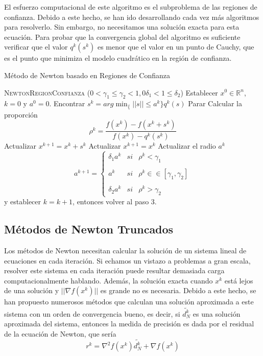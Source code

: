 El esfuerzo computacional de este algoritmo es el subproblema de las regiones de confianza. 
Debido a este hecho, se han ido desarrollando cada vez más algoritmos para resolverlo. 
Sin embargo, no necesitamos una solución exacta para esta ecuación. 
Para probar que la convergencia global del algoritmo es suficiente verificar que el valor $q^k(s^k)$ es menor que el valor en un punto de Cauchy, que es el punto que minimiza el modelo cuadrático en la región de confianza.

\begin{algorithm}[H]
\caption{Método de Newton basado en Regiones de Confianza}\label{alg:TrustRegionNewton}
\begin{algorithmic}[1]
\Procedure \textsc{NewtonRegionConfianza} ($0<\gamma_1\leq\gamma_2<1, 0 \delta_1 < 1 \leq\delta_2$)
\State Establecer $x^0\in\mathbb{R}^n$, $k=0$ y $a^0=0$.
\State Encontrar $s^k = arg \min_\{||s||\leq a^k\}q^k(s)$
	\State Parar
\Else
	\State Calcular la proporción \begin{equation*}
	\rho^k = \dfrac{f(x^k)-f(x^k+s^k)}{f(x^k)-q^k(s^k)}
	\end{equation*}
		\State Actualizar $x^{k+1}=x^k + s^k$
	\Else
		\State Actualizar $x^{k+1} = x^k$
	\EndIf
	\State Actualizar el radio $a^k$
	\begin{equation*}
	a^{k+1} = \left\{ \begin{array}{lcc}
             \delta_1a^k &   si  & \rho^k < \gamma_1 \\
             \\ a^k &  si & \rho^k\in\in [\gamma_1,\gamma_2] \\
             \\ \delta_2a^k & si & \rho^k > \gamma_2
             \end{array}
   \right.
	\end{equation*}
	y establecer $k=k+1$, entonces volver al paso 3.
\EndIf
\EndProcedure
\end{algorithmic}
\end{algorithm}

\subsection{Métodos de Newton Truncados}

Los métodos de Newton necesitan calcular la solución de un sistema lineal de ecuaciones en cada iteración. 
Si echamos un vistazo a problemas a gran escala, resolver este sistema en cada iteración puede resultar demasiada carga computacionalmente hablando. 
Además, la solución exacta cuando $x^k$ está lejos de una solución y $||\nabla f(x^k)||$ es grande no es necesaria. 
Debido a este hecho, se han propuesto numerosos métodos que calculan una solución aproximada a este sistema con un orden de convergencia bueno, es decir, si $\widetilde{d^k_N}$ es una solución aproximada del sistema, entonces la medida de precisión es dada por el residual de la ecuación de Newton, que sería 
\begin{equation*}
r^k = \nabla^2 f(x^k)\widetilde{d^k_N} + \nabla f(x^k)
\end{equation*}

